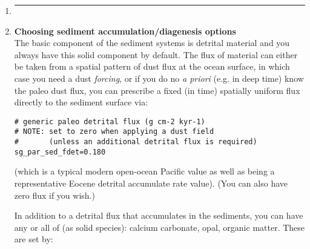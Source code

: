 \begin{enumerate}[noitemsep]
\item []\noindent\rule{4cm}{0.5pt}
\vspace{1mm}

\newpage
%
\vspace{2mm}
\item \textbf{Choosing sediment accumulation/diagenesis options}
\vspace{1mm}
\\The basic component of the sediment systems is detrital material and you always have this solid component by default. The flux of material can either be taken from a spatial pattern of dust flux at the ocean surface, in which case you need a dust \textit{forcing}, or if you do no \textit{a priori} (e.g. in deep time) know the paleo dust flux, you can prescribe a fixed (in time) spatially uniform flux directly to the sediment surface via:
\vspace{-1mm}\small\begin{verbatim}
# generic paleo detrital flux (g cm-2 kyr-1)
# NOTE: set to zero when applying a dust field
#       (unless an additional detrital flux is required)
sg_par_sed_fdet=0.180
\end{verbatim}\normalsize\vspace{-1mm}
(which is a typical modern open-ocean Pacific value as well as being a representative Eocene detrital accumulate rate value). (You can also have zero flux if you wish.)

\vspace{1mm}
In addition to a detrital flux that accumulates in the sediments, you can have any or all of (as solid species): calcium carbonate, opal, organic matter. These are set by:


\end{enumerate}
